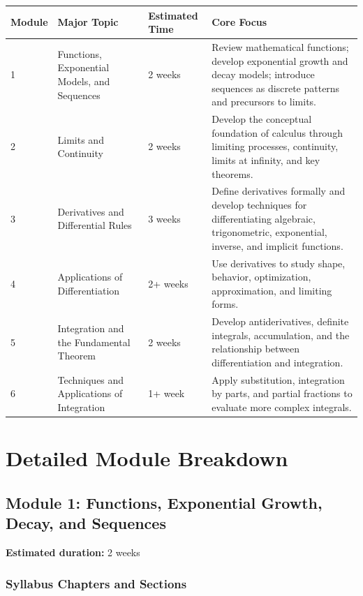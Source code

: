 \documentclass[11pt]{article}
\begin{document}
\begin{longtable}{p{} p{} p{} p{}}
\toprule
\textbf{Module} & \textbf{Major Topic} & \textbf{Estimated Time} & \textbf{Core Focus} \\
\midrule
\endhead

1 & Functions, Exponential Models, and Sequences & 2 weeks &
Review mathematical functions; develop exponential growth and decay models; introduce sequences as discrete patterns and precursors to limits. \\

2 & Limits and Continuity & 2 weeks &
Develop the conceptual foundation of calculus through limiting processes, continuity, limits at infinity, and key theorems. \\

3 & Derivatives and Differential Rules & 3 weeks &
Define derivatives formally and develop techniques for differentiating algebraic, trigonometric, exponential, inverse, and implicit functions. \\

4 & Applications of Differentiation & 2+ weeks &
Use derivatives to study shape, behavior, optimization, approximation, and limiting forms. \\

5 & Integration and the Fundamental Theorem & 2 weeks &
Develop antiderivatives, definite integrals, accumulation, and the relationship between differentiation and integration. \\

6 & Techniques and Applications of Integration & 1+ week &
Apply substitution, integration by parts, and partial fractions to evaluate more complex integrals. \\
\bottomrule
\end{longtable}

\section{Detailed Module Breakdown}

\subsection{Module 1: Functions, Exponential Growth, Decay, and Sequences}

\textbf{Estimated duration:} 2 weeks

\subsubsection{Syllabus Chapters and Sections}
\end{document}
